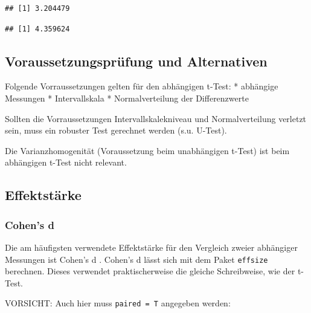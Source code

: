 \documentclass[
]{book}
\newenvironment{Shaded}{\begin{snugshade}}{\end{snugshade}}
\newcommand{\AttributeTok}[1]{\textcolor[rgb]{0.77,0.63,0.00}{#1}}
\newcommand{\DecValTok}[1]{\textcolor[rgb]{0.00,0.00,0.81}{#1}}
\newcommand{\FunctionTok}[1]{\textcolor[rgb]{0.00,0.00,0.00}{#1}}
\newcommand{\NormalTok}[1]{#1}
\newcommand{\SpecialCharTok}[1]{\textcolor[rgb]{0.00,0.00,0.00}{#1}}
\begin{document}
\begin{verbatim}
## [1] 3.204479
\end{verbatim}

\begin{Shaded}
\end{Shaded}

\begin{verbatim}
## [1] 4.359624
\end{verbatim}

\hypertarget{voraussetzungspruxfcfung-und-alternativen-1}{%
\subsection{Voraussetzungsprüfung und Alternativen}\label{voraussetzungspruxfcfung-und-alternativen-1}}

Folgende Vorraussetzungen gelten für den abhängigen t-Test:
* abhängige Messungen
* Intervallskala
* Normalverteilung der Differenzwerte

Sollten die Vorraussetzungen Intervallskalekniveau und Normalverteilung verletzt sein, muss ein robuster Test gerechnet werden (s.u. U-Test).

Die Varianzhomogenität (Voraussetzung beim unabhängigen t-Test) ist beim abhängigen t-Test nicht relevant.

\hypertarget{effektstuxe4rke-2}{%
\subsection{Effektstärke}\label{effektstuxe4rke-2}}

\hypertarget{cohens-d-2}{%
\subsubsection{Cohen's d}\label{cohens-d-2}}

Die am häufigsten verwendete Effektstärke für den Vergleich zweier abhängiger Messungen ist Cohen's d \citet{cohen1988statistical}.
Cohen's d lässt sich mit dem Paket \texttt{effsize} berechnen. Dieses verwendet praktischerweise die gleiche Schreibweise, wie der t-Test.

VORSICHT: Auch hier muss \texttt{paired\ =\ T} angegeben werden:
\end{document}
